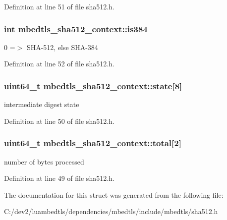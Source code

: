 Definition at line 51 of file sha512.\-h.

\hypertarget{structmbedtls__sha512__context_a5061492d17d1a77471e61b0353db4e58}{
\subsubsection[{is384}]{\setlength{\rightskip}{0pt plus 5cm}int mbedtls\-\_\-sha512\-\_\-context\-::is384}}\label{structmbedtls__sha512__context_a5061492d17d1a77471e61b0353db4e58}
0 =$>$ S\-H\-A-\/512, else S\-H\-A-\/384 

Definition at line 52 of file sha512.\-h.

\hypertarget{structmbedtls__sha512__context_a9c7c627cf1904c576244eaca0c5d7928}{
\subsubsection[{state}]{\setlength{\rightskip}{0pt plus 5cm}uint64\-\_\-t mbedtls\-\_\-sha512\-\_\-context\-::state\mbox{[}8\mbox{]}}}\label{structmbedtls__sha512__context_a9c7c627cf1904c576244eaca0c5d7928}
intermediate digest state 

Definition at line 50 of file sha512.\-h.

\hypertarget{structmbedtls__sha512__context_a0c0c3f28093d6107c549d235bcd50726}{
\subsubsection[{total}]{\setlength{\rightskip}{0pt plus 5cm}uint64\-\_\-t mbedtls\-\_\-sha512\-\_\-context\-::total\mbox{[}2\mbox{]}}}\label{structmbedtls__sha512__context_a0c0c3f28093d6107c549d235bcd50726}
number of bytes processed 

Definition at line 49 of file sha512.\-h.



The documentation for this struct was generated from the following file\-:\begin{DoxyCompactItemize}
\item 
C\-:/dev2/luambedtls/dependencies/mbedtls/include/mbedtls/sha512.\-h\end{DoxyCompactItemize}
